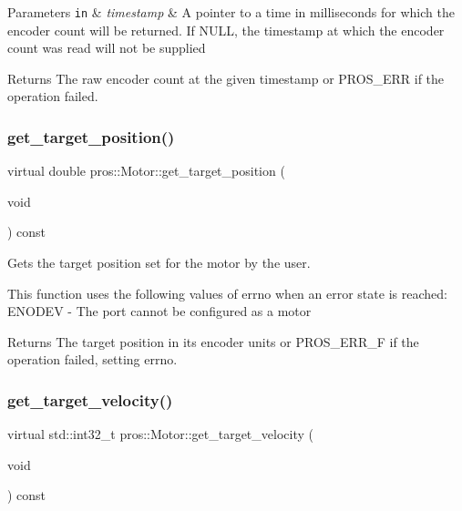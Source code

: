 \begin{DoxyParams}[1]{Parameters}
\mbox{\tt in}  & {\em timestamp} & A pointer to a time in milliseconds for which the encoder count will be returned. If N\+U\+LL, the timestamp at which the encoder count was read will not be supplied\\
\hline
\end{DoxyParams}
\begin{DoxyReturn}{Returns}
The raw encoder count at the given timestamp or P\+R\+O\+S\+\_\+\+E\+RR if the operation failed. 
\end{DoxyReturn}
\mbox{\label{classpros_1_1Motor_a7ad83a73bf15b94aaad8d10970bb254c}} 
\subsubsection{\texorpdfstring{get\+\_\+target\+\_\+position()}{get\_target\_position()}}
{\footnotesize\ttfamily virtual double pros\+::\+Motor\+::get\+\_\+target\+\_\+position (\begin{DoxyParamCaption}\item[{void}]{ }\end{DoxyParamCaption}) const\hspace{0.3cm}{\ttfamily [virtual]}}



Gets the target position set for the motor by the user. 

This function uses the following values of errno when an error state is reached\+: E\+N\+O\+D\+EV -\/ The port cannot be configured as a motor

\begin{DoxyReturn}{Returns}
The target position in its encoder units or P\+R\+O\+S\+\_\+\+E\+R\+R\+\_\+F if the operation failed, setting errno. 
\end{DoxyReturn}
\mbox{\label{classpros_1_1Motor_a8b8148a179cfadd579c8d4c82eb5873f}} 
\subsubsection{\texorpdfstring{get\+\_\+target\+\_\+velocity()}{get\_target\_velocity()}}
{\footnotesize\ttfamily virtual std\+::int32\+\_\+t pros\+::\+Motor\+::get\+\_\+target\+\_\+velocity (\begin{DoxyParamCaption}\item[{void}]{ }\end{DoxyParamCaption}) const\hspace{0.3cm}{\ttfamily [virtual]}}



